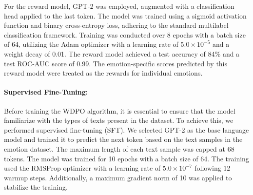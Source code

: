 For the reward model, GPT-2 was employed, augmented with a classification head applied to the last token. The model was trained using a sigmoid activation function and binary cross-entropy loss, adhering to the standard multilabel classification framework. Training was conducted over 8 epochs with a batch size of 64, utilizing the Adam optimizer with a learning rate of $5.0 \times 10^{-5} $ and a weight decay of 0.01. The reward model achieved a test accuracy of 84\% and a test ROC-AUC score of 0.99. The emotion-specific scores predicted by this reward model were treated as the rewards for individual emotions.

\paragraph{Supervised Fine-Tuning:}
Before training the WDPO algorithm, it is essential to ensure that the model familiarize with the types of texts present in the dataset. To achieve this, we performed supervised fine-tuning (SFT). We selected GPT-2 as the base language model and trained it to predict the next token based on the text samples in the emotion dataset. The maximum length of each text sample was capped at 68 tokens. The model was trained for 10 epochs with a batch size of 64. The training used the RMSProp optimizer with a learning rate of $5.0 \times 10^{-7} $ following 12 warmup steps. Additionally, a maximum gradient norm of 10 was applied to stabilize the training.

